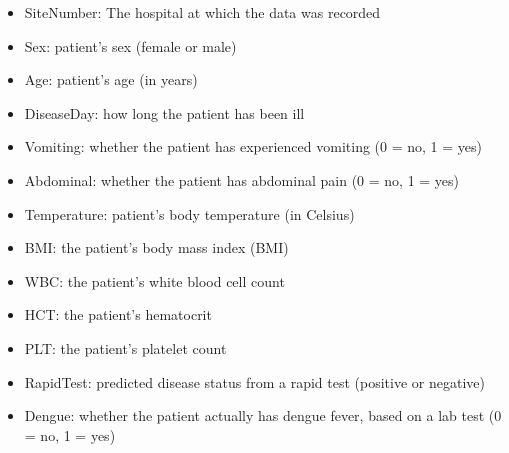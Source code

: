 \documentclass[11pt]{article}
\begin{document}
\begin{itemize}
\item SiteNumber: The hospital at which the data was recorded 
\item Sex: patient's sex (female or male)
\item Age: patient's age (in years)
\item DiseaseDay: how long the patient has been ill
\item Vomiting: whether the patient has experienced vomiting (0 = no, 1 = yes)
\item Abdominal: whether the patient has abdominal pain (0 = no, 1 = yes)
\item Temperature: patient's body temperature (in Celsius)
\item BMI: the patient's body mass index (BMI)
\item WBC: the patient's white blood cell count
\item HCT: the patient's hematocrit
\item PLT: the patient's platelet count
\item RapidTest: predicted disease status from a rapid test (positive or negative)
\item Dengue: whether the patient actually has dengue fever, based on a lab test (0 = no, 1 = yes)
\end{itemize}

\newpage
\end{document}

